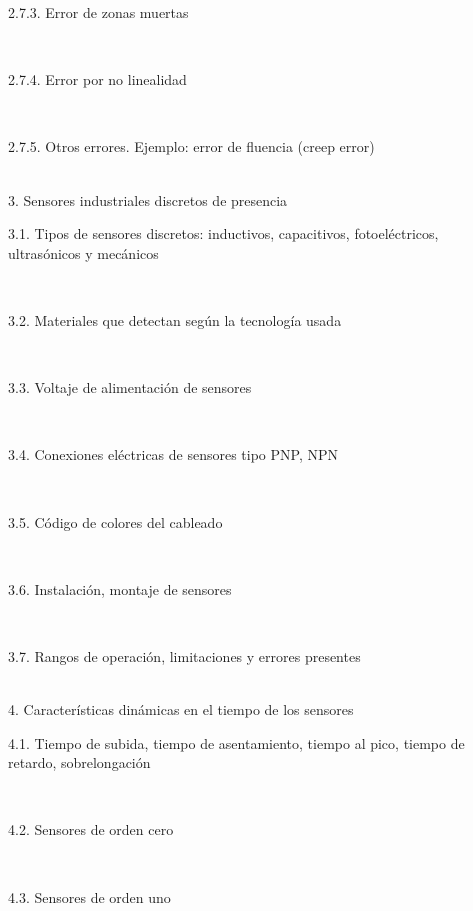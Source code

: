 \documentclass[letterpaper]{article}%
\begin{document}
\begin{tcolorbox}
\hspace*{0.04\linewidth}\parbox{0.96\linewidth}{\strut 2.7.3. Error de zonas muertas\strut}\\
\hspace*{0.04\linewidth}\parbox{0.96\linewidth}{\strut 2.7.4. Error por no linealidad\strut}\\
\hspace*{0.04\linewidth}\parbox{0.96\linewidth}{\strut 2.7.5. Otros errores. Ejemplo: error de fluencia (creep error)\strut}\\
3. Sensores industriales discretos de presencia\\
\hspace*{0.02\linewidth}\parbox{0.98\linewidth}{\strut 3.1. Tipos de sensores discretos: inductivos, capacitivos, fotoeléctricos, ultrasónicos  y mecánicos\strut}\\
\hspace*{0.02\linewidth}\parbox{0.98\linewidth}{\strut 3.2. Materiales que detectan según la tecnología usada\strut}\\
\hspace*{0.02\linewidth}\parbox{0.98\linewidth}{\strut 3.3. Voltaje de alimentación de sensores\strut}\\
\hspace*{0.02\linewidth}\parbox{0.98\linewidth}{\strut 3.4. Conexiones eléctricas de sensores tipo PNP, NPN\strut}\\
\hspace*{0.02\linewidth}\parbox{0.98\linewidth}{\strut 3.5. Código de colores del cableado\strut}\\
\hspace*{0.02\linewidth}\parbox{0.98\linewidth}{\strut 3.6. Instalación, montaje de sensores\strut}\\
\hspace*{0.02\linewidth}\parbox{0.98\linewidth}{\strut 3.7. Rangos de operación, limitaciones y errores presentes\strut}\\
4. Características dinámicas en el tiempo de los sensores \\
\hspace*{0.02\linewidth}\parbox{0.98\linewidth}{\strut 4.1. Tiempo de subida, tiempo de asentamiento, tiempo al pico, tiempo de retardo, sobrelongación\strut}\\
\hspace*{0.02\linewidth}\parbox{0.98\linewidth}{\strut 4.2. Sensores de orden cero\strut}\\
\hspace*{0.02\linewidth}\parbox{0.98\linewidth}{\strut 4.3. Sensores de orden uno\strut}\\

\end{tcolorbox}
\end{document}
